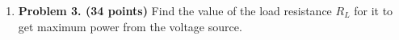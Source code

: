 \begin{enumerate}


\item {\bf Problem 3. (34 points)} 
Find the value of the load resistance $R_L$ for it to get maximum power 
from the voltage source.




\end{enumerate}
